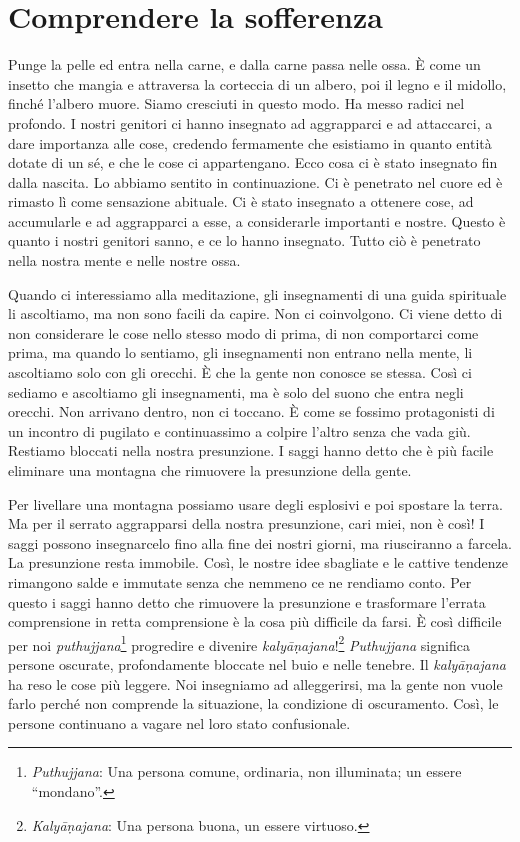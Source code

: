 \chapter{Comprendere la sofferenza}

Punge la pelle ed entra nella carne, e dalla carne passa nelle ossa. È
come un insetto che mangia e attraversa la corteccia di un albero, poi
il legno e il midollo, finché l'albero muore. Siamo cresciuti in questo
modo. Ha messo radici nel profondo. I nostri genitori ci hanno insegnato
ad aggrapparci e ad attaccarci, a dare importanza alle cose, credendo
fermamente che esistiamo in quanto entità dotate di un sé, e che le cose
ci appartengano. Ecco cosa ci è stato insegnato fin dalla nascita. Lo
abbiamo sentito in continuazione. Ci è penetrato nel cuore ed è rimasto
lì come sensazione abituale. Ci è stato insegnato a ottenere cose, ad
accumularle e ad aggrapparci a esse, a considerarle importanti e nostre.
Questo è quanto i nostri genitori sanno, e ce lo hanno insegnato. Tutto
ciò è penetrato nella nostra mente e nelle nostre ossa.

Quando ci interessiamo alla meditazione, gli insegnamenti di una guida
spirituale li ascoltiamo, ma non sono facili da capire. Non ci
coinvolgono. Ci viene detto di non considerare le cose nello stesso modo
di prima, di non comportarci come prima, ma quando lo sentiamo, gli
insegnamenti non entrano nella mente, li ascoltiamo solo con gli
orecchi. È che la gente non conosce se stessa. Così ci sediamo e
ascoltiamo gli insegnamenti, ma è solo del suono che entra negli
orecchi. Non arrivano dentro, non ci toccano. È come se fossimo
protagonisti di un incontro di pugilato e continuassimo a colpire
l'altro senza che vada giù. Restiamo bloccati nella nostra presunzione.
I saggi hanno detto che è più facile eliminare una montagna che
rimuovere la presunzione della gente.

Per livellare una montagna possiamo usare degli esplosivi e poi spostare
la terra. Ma per il serrato aggrapparsi della nostra presunzione, cari
miei, non è così! I saggi possono insegnarcelo fino alla fine dei nostri
giorni, ma riusciranno a farcela. La presunzione resta immobile. Così,
le nostre idee sbagliate e le cattive tendenze rimangono salde e
immutate senza che nemmeno ce ne rendiamo conto. Per questo i saggi
hanno detto che rimuovere la presunzione e trasformare l'errata
comprensione in retta comprensione è la cosa più difficile da farsi. È
così difficile per noi \emph{puthujjana}\footnote{\emph{Puthujjana}: Una
  persona comune, ordinaria, non illuminata; un essere ``mondano''.}
progredire e divenire \emph{kalyāṇajana}!\footnote{\emph{Kalyāṇajana}:
  Una persona buona, un essere virtuoso.} \emph{Puthujjana} significa
persone oscurate, profondamente bloccate nel buio e nelle tenebre. Il
\emph{kalyāṇajana} ha reso le cose più leggere. Noi insegniamo ad
alleggerirsi, ma la gente non vuole farlo perché non comprende la
situazione, la condizione di oscuramento. Così, le persone continuano a
vagare nel loro stato confusionale.

